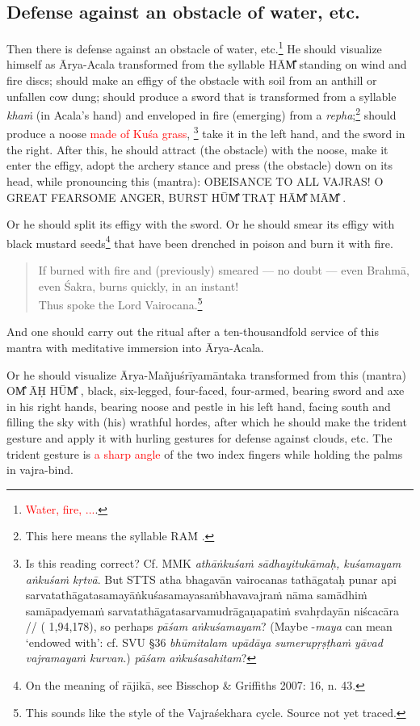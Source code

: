 \documentclass[11pt]{book}
\makeatletter
\def\fakesc#1{%
  \begingroup%
  \xdef\fake@name{\csname\curr@fontshape/\f@size\endcsname}%
  \fontsize{1.3\fontdimen8\fake@name}{\baselineskip}\selectfont%
  \uppercase{#1}%
  \endgroup%
}
\newcommand{\mantra}[1]{\fakesc{#1}}
\newcommand{\red}[1]{\textcolor{red}{#1}}
\newcommand{\skt}[1]{\emph{#1}}
\makeatother
\begin{document}
\subsection{Defense against an obstacle of water, etc.}
Then there is defense against an obstacle of water, etc.\footnote{\red{Water, fire, ...}.} He should visualize himself as Ārya-Acala transformed from the syllable \mantra{hām̐} standing on wind and fire discs; should make an effigy of the obstacle with soil from an anthill or unfallen cow dung; should produce a sword that is transformed from a syllable \skt{khaṁ} (in Acala's hand) and enveloped in fire (emerging) from a \skt{repha};\footnote{This here means the syllable \mantra{raṁ}.} should produce a noose \red{made of Kuśa grass},
\footnote{Is this reading correct? Cf. MMK \skt{athāṅkuśaṁ sādhayitukāmaḥ, kuśamayam aṅkuśaṁ kṛtvā}. But STTS atha bhagavān vairocanas tathāgataḥ punar api sarvatathāgatasamayāṅkuśasamayasaṁbhavavajraṁ nāma samādhiṁ samāpadyemaṁ sarvatathāgatasarvamudrāgaṇapatiṁ svahṛdayān niścacāra // ( 1,94,178), so perhaps \skt{pāśam aṅkuśamayam}? (Maybe -\skt{maya} can mean `endowed with': cf. SVU §36 \skt{bhūmitalam upādāya sumerupṛṣṭhaṁ yāvad vajramayaṁ kurvan}.) \skt{pāśam aṅkuśasahitam}?}  take it in the left hand, and the sword in the right. After this, he should attract (the obstacle) with the noose, make it enter the effigy, adopt the archery stance and press (the obstacle) down on its head, while pronouncing this (mantra): \mantra{obeisance to all vajras! o great fearsome anger, burst hūm̐ traṭ hām̐ mām̐}.

Or he should split its effigy with the sword. Or he should smear its effigy with black mustard seeds\footnote{On the meaning of rājikā, see Bisschop \& Griffiths 2007: 16, n. 43.} that have been drenched in poison and burn it with fire.

\begin{verse}
If burned with fire and (previously) smeared — no doubt — even Brahmā, even Śakra, burns quickly, in an instant!\\
Thus spoke the Lord Vairocana.\footnote{This sounds like the style of the Vajraśekhara cycle. Source not yet traced.}
\end{verse}

And one should carry out the ritual after a ten-thousandfold service of this mantra with meditative immersion into Ārya-Acala.

Or he should visualize Ārya-Mañjuśrīyamāntaka transformed from this (mantra) \mantra{om̐ āḥ hūm̐}, black, six-legged, four-faced, four-armed, bearing sword and axe in his right hands, bearing noose and pestle in his left hand, facing south and filling the sky with (his) wrathful hordes, after which he should make the trident gesture and apply it with hurling gestures for defense against clouds, etc. The trident gesture is \red{a sharp angle} of the two index fingers while holding the palms in vajra-bind.
\end{document}

